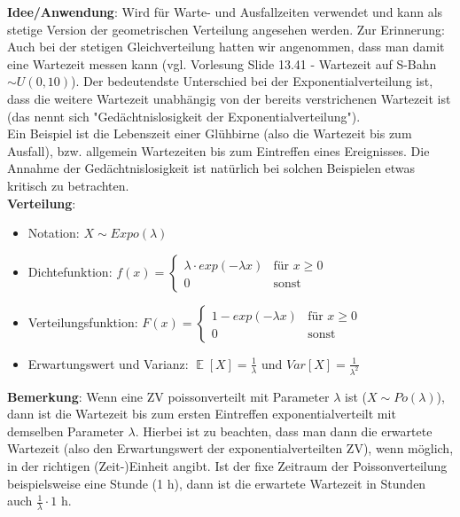 \documentclass[a4paper]{article}
\DeclareMathOperator*{\E}{\mathbb{E}}
\begin{document}
\textbf{Idee/Anwendung}: Wird für Warte- und Ausfallzeiten verwendet und kann als stetige Version der geometrischen Verteilung angesehen werden. Zur Erinnerung: Auch bei der stetigen Gleichverteilung hatten wir angenommen, dass man damit eine Wartezeit messen kann (vgl. Vorlesung Slide 13.41 - Wartezeit auf S-Bahn $\sim U(0,10)$). Der bedeutendste Unterschied bei der Exponentialverteilung ist, dass die weitere Wartezeit unabhängig von der bereits verstrichenen Wartezeit ist (das nennt sich "Gedächtnislosigkeit der Exponentialverteilung"). \\

\noindent Ein Beispiel ist die Lebenszeit einer Glühbirne (also die Wartezeit bis zum Ausfall), bzw. allgemein Wartezeiten bis zum Eintreffen eines Ereignisses. Die Annahme der Gedächtnislosigkeit ist natürlich bei solchen Beispielen etwas kritisch zu betrachten.\\

\noindent \textbf{Verteilung}:
\begin{itemize}
\item[] Notation: $X \sim Expo(\lambda)$
\item[] Dichtefunktion: $f(x)=\begin{cases}
			\lambda \cdot exp(-\lambda x) & \text{für $x \geq 0$}\\
            0 & \text{sonst}
		 \end{cases}$ 
\item[] Verteilungsfunktion: $F(x)=\begin{cases}
			1 - exp(-\lambda x) & \text{für $x \geq 0$}\\
            0 & \text{sonst}
		 \end{cases}$ 
\item[] Erwartungswert und Varianz: $\E[X]= \frac{1}{\lambda}$ und $Var[X]=\frac{1}{\lambda^2}$

\end{itemize}

\noindent \textbf{Bemerkung}: Wenn eine ZV poissonverteilt mit Parameter $\lambda$ ist ($X \sim Po(\lambda)$), dann ist die Wartezeit bis zum ersten Eintreffen exponentialverteilt mit demselben Parameter $\lambda$. Hierbei ist zu beachten, dass man dann die erwartete Wartezeit (also den Erwartungswert der exponentialverteilten ZV), wenn möglich, in der richtigen (Zeit-)Einheit angibt. Ist der fixe Zeitraum der Poissonverteilung beispielsweise eine Stunde (1 h), dann ist die erwartete Wartezeit in Stunden auch $\frac{1}{\lambda} \cdot 1$ h.
\end{document}
